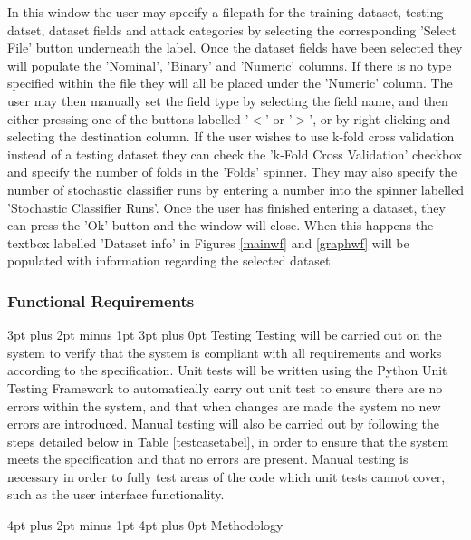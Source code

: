 \documentclass[12pt,a4paper]{article}
\makeatletter
\renewcommand\subsection{\@startsection {subsection}{1}{2mm} %
      {3pt plus 2pt minus 1pt} %
      {3pt plus 0pt} %
      {\normalfont\bfseries}}
\renewcommand\section{\@startsection {section}{1}{0mm} %
      {4pt plus 2pt minus 1pt} %
      {4pt plus 0pt} %
      {\bfseries}}
\makeatother
\begin{document}
In this window the user may specify a filepath for the training dataset, testing datset, dataset fields and attack categories by selecting the corresponding 'Select File' button underneath the label. Once the dataset fields have been selected they will populate the 'Nominal', 'Binary' and 'Numeric' columns. If there is no type specified within the file they will all be placed under the 'Numeric' column. The user may then manually set the field type by selecting the field name, and then either pressing one of the buttons labelled '$<$' or '$>$', or by right clicking and selecting the destination column. If the user wishes to use k-fold cross validation instead of a testing dataset they can check the 'k-Fold Cross Validation' checkbox and specify the number of folds in the 'Folds' spinner. They may also specify the number of stochastic classifier runs by entering a number into the spinner labelled 'Stochastic Classifier Runs'. Once the user has finished entering a dataset, they can press the 'Ok' button and the window will close. When this happens the textbox labelled 'Dataset info' in Figures \ref{mainwf} and \ref{graphwf} will be populated with information regarding the selected dataset.


\subsubsection{Functional Requirements} \label{reqspec}

\subsection{Testing}
Testing will be carried out on the system to verify that the system is compliant with all requirements and works according to the specification. Unit tests will be written using the Python Unit Testing Framework to automatically carry out unit test to ensure there are no errors within the system, and that when changes are made the system no new errors are introduced. Manual testing will also be carried out by following the steps detailed below in Table \ref{testcasetabel}, in order to ensure that the system meets the specification and that no errors are present. Manual testing is necessary in order to fully test areas of the code which unit tests cannot cover, such as the user interface functionality.


\newpage
\section{Methodology}
\end{document}
